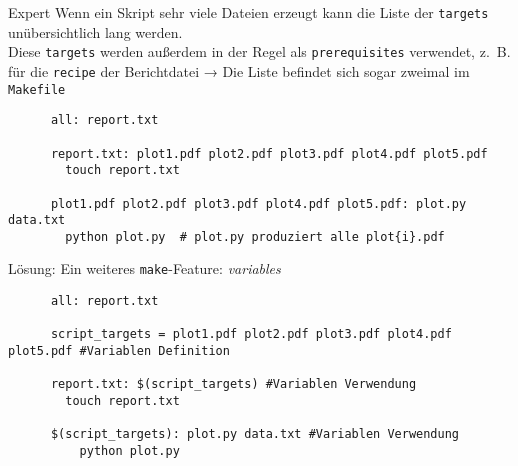 \begin{frame}[fragile]{Expert}
  Wenn ein Skript sehr viele Dateien erzeugt kann die Liste der \texttt{targets} unübersichtlich lang werden.\\
  Diese \texttt{targets} werden außerdem in der Regel als \texttt{prerequisites} verwendet,
  z.~B. für die \texttt{recipe} der Berichtdatei  → Die Liste befindet sich sogar zweimal im \texttt{Makefile}

  \begin{center}
    \small
    \begin{verbatim}
      all: report.txt

      report.txt: plot1.pdf plot2.pdf plot3.pdf plot4.pdf plot5.pdf
        touch report.txt

      plot1.pdf plot2.pdf plot3.pdf plot4.pdf plot5.pdf: plot.py data.txt
        python plot.py  # plot.py produziert alle plot{i}.pdf 
    \end{verbatim}
  \end{center}
  Lösung: Ein weiteres \texttt{make}-Feature: \emph{variables}
  \begin{center}
    \small
    \begin{verbatim}
      all: report.txt

      script_targets = plot1.pdf plot2.pdf plot3.pdf plot4.pdf plot5.pdf #Variablen Definition

      report.txt: $(script_targets) #Variablen Verwendung
        touch report.txt
      
      $(script_targets): plot.py data.txt #Variablen Verwendung
          python plot.py
    \end{verbatim}
  \end{center}
\end{frame}
